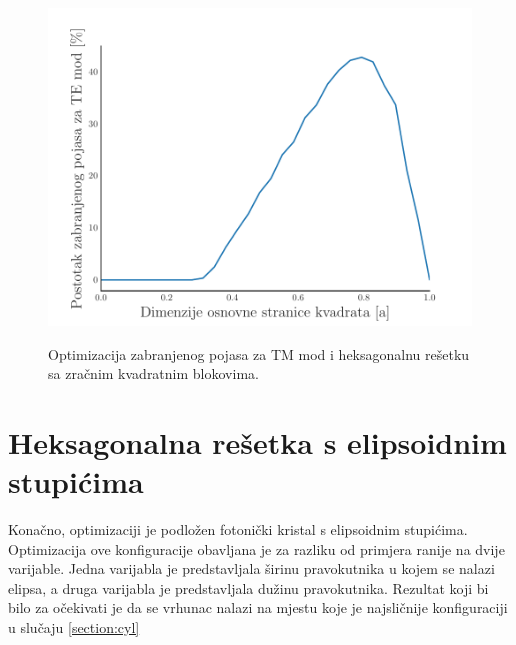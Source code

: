 \documentclass[utf8, seminar, numeric]{fer}
\begin{document}
\begin{figure}[ht]
    {\includegraphics[width=1.0\linewidth]
    	{./images/pdf/optimization_block_te.pdf}}%
	\caption{Optimizacija zabranjenog pojasa za TM mod i heksagonalnu rešetku sa
	zračnim kvadratnim blokovima.}
	\label{fig:triangular_squares_te_optimization}
\end{figure}


\FloatBarrier

\section{Heksagonalna rešetka s elipsoidnim stupićima}

Konačno, optimizaciji je podložen fotonički kristal s elipsoidnim stupićima.
Optimizacija ove konfiguracije obavljana je za razliku od primjera ranije na
dvije varijable. Jedna varijabla je predstavljala širinu pravokutnika u kojem se
nalazi elipsa, a druga varijabla je predstavljala dužinu pravokutnika.
Rezultat koji bi bilo za očekivati je da se vrhunac nalazi na mjestu koje je
najsličnije konfiguraciji u slučaju \ref{section:cyl}
\end{document}
